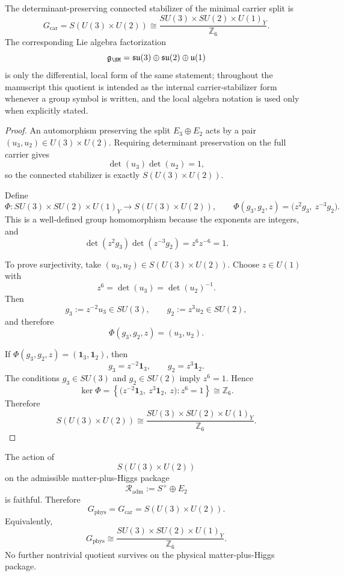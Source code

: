 \begin{theorem}
\label{thm:global-sm-theorem}
The determinant-preserving connected stabilizer of the minimal carrier split is
\[
G_{\mathrm{car}}
=
S(U(3)\times U(2))
\cong
\frac{SU(3)\times SU(2)\times U(1)_Y}{\mathbb Z_6}.
\]
The corresponding Lie algebra factorization
\[
\mathfrak g_{\SM}=\mathfrak{su}(3)\oplus\mathfrak{su}(2)\oplus\mathfrak u(1)
\]
is only the differential, local form of the same statement; throughout the manuscript this quotient
is intended as the internal carrier-stabilizer form whenever a group symbol is written, and the
local algebra notation is used only when explicitly stated.
\end{theorem}

\begin{proof}
An automorphism preserving the split $E_3\oplus E_2$ acts by a pair
$(u_3,u_2)\in U(3)\times U(2)$. Requiring determinant preservation on the full
carrier gives
\[
\det(u_3)\det(u_2)=1,
\]
so the connected stabilizer is exactly $S(U(3)\times U(2))$.

Define
\[
\Phi:SU(3)\times SU(2)\times U(1)_Y \longrightarrow S(U(3)\times U(2)),
\qquad
\Phi(g_3,g_2,z)=\bigl(z^2 g_3,\ z^{-3} g_2\bigr).
\]
This is a well-defined group homomorphism because the exponents are integers, and
\[
\det(z^2 g_3)\det(z^{-3} g_2)=z^6 z^{-6}=1.
\]

To prove surjectivity, take $(u_3,u_2)\in S(U(3)\times U(2))$. Choose
$z\in U(1)$ with
\[
z^6=\det(u_3)=\det(u_2)^{-1}.
\]
Then
\[
g_3:=z^{-2}u_3\in SU(3),
\qquad
g_2:=z^{3}u_2\in SU(2),
\]
and therefore
\[
\Phi(g_3,g_2,z)=(u_3,u_2).
\]

If $\Phi(g_3,g_2,z)=(\mathbf 1_3,\mathbf 1_2)$, then
\[
g_3=z^{-2}\mathbf 1_3,
\qquad
g_2=z^{3}\mathbf 1_2.
\]
The conditions $g_3\in SU(3)$ and $g_2\in SU(2)$ imply $z^6=1$. Hence
\[
\ker\Phi
=
\left\{
\bigl(z^{-2}\mathbf 1_3,\ z^{3}\mathbf 1_2,\ z\bigr): z^6=1
\right\}
\cong \mathbb Z_6.
\]
Therefore
\[
S(U(3)\times U(2))
\cong
\frac{SU(3)\times SU(2)\times U(1)_Y}{\mathbb Z_6}.
\]
\end{proof}

\begin{theorem}
\label{thm:physical-gauge-group}
\label{thm:physical-gauge-group-faithful}
The action of
\[
S(U(3)\times U(2))
\]
on the admissible matter-plus-Higgs package
\[
\mathcal R_{\mathrm{adm}}:=S^+\oplus E_2
\]
is faithful. Therefore
\[
G_{\mathrm{phys}}=G_{\mathrm{car}}=S(U(3)\times U(2)).
\]
Equivalently,
\[
G_{\mathrm{phys}}
\cong
\frac{SU(3)\times SU(2)\times U(1)_Y}{\mathbb Z_6}.
\]
No further nontrivial quotient survives on the physical matter-plus-Higgs package.
\end{theorem}

